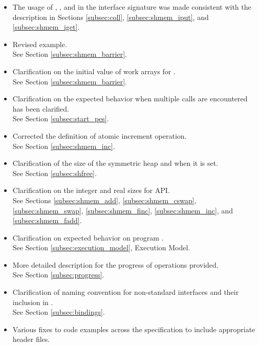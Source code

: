 \begin{itemize}
\item The usage of , , and  in the interface signature 
      was made consistent with the description in Sections \cbstart \ref{subsec:coll}, \ref{subsec:shmem_iput}, and \ref{subsec:shmem_iget}.
\item Revised example.\\See Section \ref{subsec:shmem_barrier}. 
\item Clarification on the initial value of  work arrays for .\\ See Section \ref{subsec:shmem_barrier}. 
\item Clarification on the expected behavior when multiple  calls are encountered has been clarified.\\See Section \ref{subsec:start_pes}.
\item Corrected the definition of atomic increment operation.\\See Section \ref{subsec:shmem_inc}. 
\item Clarification of the size of the symmetric heap and when it is set.\\See Section \ref{subsec:shfree}.
\item Clarification on the integer and real sizes for \Fortran{} \ac{API}.\\See Sections \ref{subsec:shmem_add}, \ref{subsec:shmem_cswap}, \ref{subsec:shmem_swap}, \ref{subsec:shmem_finc}, \ref{subsec:shmem_inc}, and \ref{subsec:shmem_fadd}. 
\item Clarification on expected behavior on program .\\ See Section \ref{subsec:execution_model}, Execution Model. 
\item More detailed description for the progress of \openshmem operations provided.\\ See Section \ref{subsec:progress}. 
\item Clarification of naming convention for non-standard interfaces and their inclusion in .\\ See Section \ref{subsec:bindings}. 
\item Various fixes to \openshmem code examples across the specification to include appropriate header files. 

\end{itemize}
